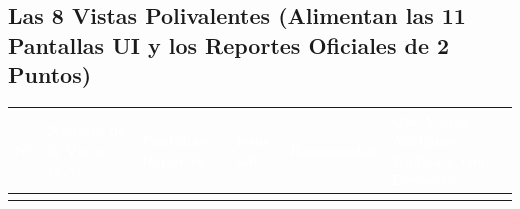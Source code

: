 \documentclass[10pt,a4paper,landscape]{article}
\begin{document}
\subsection{Las 8 Vistas Polivalentes (Alimentan las 11 Pantallas UI y los Reportes Oficiales de 2 Puntos)}
\footnotesize
\renewcommand{\arraystretch}{1.26}
\begin{longtable}{|p{0.5cm}|p{5.0cm}|p{3.8cm}|p{2.0cm}|p{2.5cm}|p{11.4cm}|}
\hline
\rowcolor{unjbgNavy}
\textcolor{white}{\textbf{N°}} & 
\textcolor{white}{\textbf{Nombre de la Vista (\texttt{v\_*})}} & 
\textcolor{white}{\textbf{Pantallas / Reportes}} & 
\textcolor{white}{\textbf{Issue Git}} & 
\textcolor{white}{\textbf{Responsable}} & 
\textcolor{white}{\textbf{Qué Vistas Antiguas Unifica y Qué Devuelve}} \\
\hline
\endfirsthead
\hline
\endlastfoot


\end{longtable}
\end{document}
